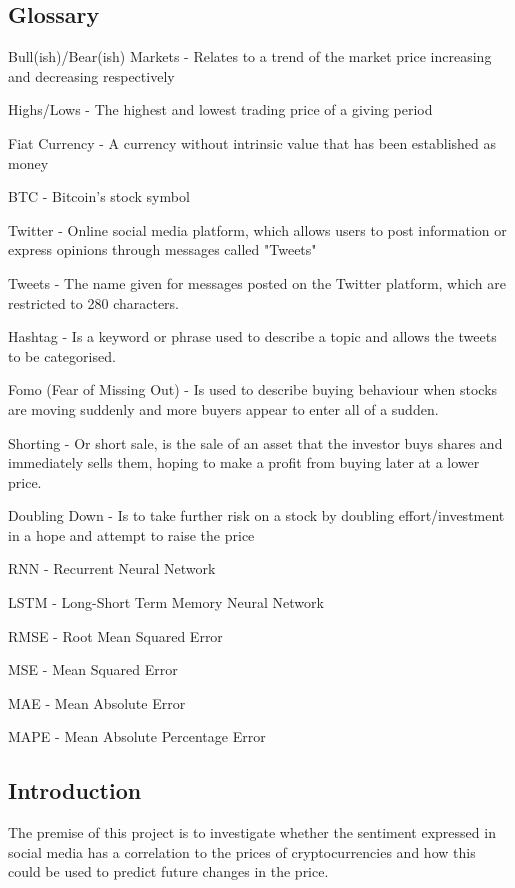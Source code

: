 \documentclass[oneside, 12pt]{article}
\begin{document}
	\newpage
	\begin{center}
		\section{Glossary}\label{glossary}
	\end{center}
	Bull(ish)/Bear(ish) Markets - Relates to a trend of the market price increasing and decreasing respectively
	
	Highs/Lows - The highest and lowest trading price of a giving period
	
	Fiat Currency - A currency without intrinsic value that has been established as money
	
	BTC - Bitcoin's stock symbol
	
	Twitter - Online social media platform, which allows users to post information or express opinions through messages called "Tweets"
	
	Tweets - The name given for messages posted on the Twitter platform, which are restricted to 280 characters.
	
	Hashtag - Is a keyword or phrase used to describe a topic and allows the tweets to be categorised.
	
	Fomo (Fear of Missing Out) - Is used to describe buying behaviour when stocks are moving suddenly and more buyers appear to enter all of a sudden.
	
	Shorting - Or short sale, is the sale of an asset that the investor buys shares and immediately sells them, hoping to make a profit from buying later at a lower price.
	
	Doubling Down - Is to take further risk on a stock by doubling effort/investment in a hope and attempt to raise the price
	
	RNN - Recurrent Neural Network
	
	LSTM - Long-Short Term Memory Neural Network
	
	RMSE - Root Mean Squared Error
	
	MSE - Mean Squared Error
	
	MAE - Mean Absolute Error
	
	MAPE - Mean Absolute Percentage Error
	
	\newpage
	
	\begin{center}
		\tableofcontents
	\end{center}
	
	\newpage
	\begin{center}
		\section{Introduction}\label{introduction}
	\end{center}
	The premise of this project is to investigate whether the sentiment expressed in social media has a correlation to the prices of cryptocurrencies and how this could be used to predict future changes in the price. 
	
\end{document}
